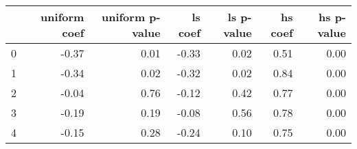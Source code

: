 \begin{tabular}{lrrrrrr}
\toprule
 & uniform coef & uniform p-value & ls coef & ls p-value & hs coef & hs p-value \\
\midrule
0 & -0.37 & 0.01 & -0.33 & 0.02 & 0.51 & 0.00 \\
1 & -0.34 & 0.02 & -0.32 & 0.02 & 0.84 & 0.00 \\
2 & -0.04 & 0.76 & -0.12 & 0.42 & 0.77 & 0.00 \\
3 & -0.19 & 0.19 & -0.08 & 0.56 & 0.78 & 0.00 \\
4 & -0.15 & 0.28 & -0.24 & 0.10 & 0.75 & 0.00 \\
\bottomrule
\end{tabular}

